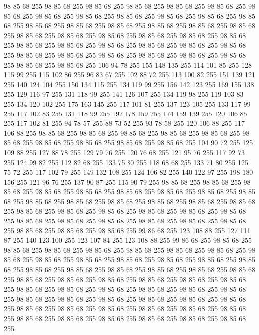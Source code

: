 98 85 68 255 98 85 68 255 98 85 68 255 98 85 68 255 98 85 68 255 98 85 68 255 98 85 68 255 98 85 68 255 98 85 68 255 98 85 68 255 98 85 68 255 98 85 68 255 98 85 68 255 98 85 68 255 98 85 68 255 98 85 68 255 98 85 68 255 98 85 68 255 98 85 68 255 98 85 68 255 98 85 68 255 98 85 68 255 98 85 68 255 98 85 68 255 98 85 68 255 98 85 68 255 98 85 68 255 98 85 68 255 98 85 68 255 98 85 68 255 98 85 68 255 98 85 68 255 98 85 68 255 98 85 68 255 98 85 68 255 98 85 68 255 98 85 68 255 98 85 68 255 98 85 68 255 106 94 78 255 155 148 135 255 114 101 85 255 128 115 99 255 115 102 86 255 96 83 67 255 102 88 72 255 113 100 82 255 151 139 121 255 140 124 104 255 150 134 115 255 134 119 99 255 156 142 123 255 169 155 138 255 129 116 97 255 131 118 99 255 141 126 107 255 134 119 98 255 119 103 83 255 134 120 102 255 175 163 145 255 117 101 81 255 137 123 105 255 133 117 99 255 117 102 83 255
131 118 99 255 192 178 159 255 174 159 139 255 120 106 85 255 117 102 81 255 94 78 57 255 88 73 52 255 93 78 58 255 120 106 88 255 117 106 88 255 98 85 68 255 98 85 68 255 98 85 68 255 98 85 68 255 98 85 68 255 98 85 68 255 98 85 68 255 98 85 68 255 98 85 68 255 98 85 68 255 104 90 72 255 125 109 88 255 127 88 78 255 129 79 76 255 120 76 68 255 121 95 76 255 117 92 73 255 124 99 82 255 112 82 68 255 133 75 80 255 118 68 68 255 133 71 80 255 125 75 72 255 117 102 79 255 149 132 108 255 124 106 82 255 140 122 97 255 198 180 156 255 121 96 76 255 137 90 87 255 115 90 79 255 98 85 68 255 98 85 68 255 98 85 68 255 98 85 68 255 98 85 68 255 98 85 68 255 98 85 68 255 98 85 68 255 98 85 68 255 98 85 68 255 98 85 68 255 98 85 68 255 98 85 68 255 98 85 68 255 98 85 68 255 98 85 68 255 98 85 68 255 98 85 68 255 98 85 68 255 98 85 68 255 98 85 68 255 98 85 68 255 98 85 68 255
98 85 68 255 98 85 68 255 98 85 68 255 98 85 68 255 98 85 68 255 98 85 68 255 98 85 68 255 99 86 68 255 123 108 88 255 127 111 87 255 140 123 100 255 123 107 84 255 123 108 88 255 99 86 68 255 98 85 68 255 98 85 68 255 98 85 68 255 98 85 68 255 98 85 68 255 98 85 68 255 98 85 68 255 98 85 68 255 98 85 68 255 98 85 68 255 98 85 68 255 98 85 68 255 98 85 68 255 98 85 68 255 98 85 68 255 98 85 68 255 98 85 68 255 98 85 68 255 98 85 68 255 98 85 68 255 98 85 68 255 98 85 68 255 98 85 68 255 98 85 68 255 98 85 68 255 98 85 68 255 98 85 68 255 98 85 68 255 98 85 68 255 98 85 68 255 98 85 68 255 98 85 68 255 98 85 68 255 98 85 68 255 98 85 68 255 98 85 68 255 98 85 68 255 98 85 68 255 98 85 68 255 98 85 68 255 98 85 68 255 98 85 68 255 98 85 68 255 98 85 68 255 98 85 68 255 98 85 68 255 98 85 68 255 98 85 68 255 98 85 68 255 98 85 68 255
